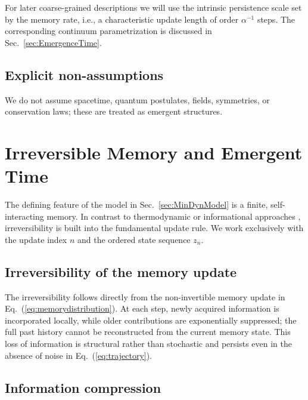 \documentclass[reprint,amsmath,amssymb,aps,prd,nofootinbib,floatfix]{revtex4-2}
\begin{document}
For later coarse-grained descriptions we will use the intrinsic persistence scale set by the memory rate, i.e., a characteristic update length of order $\alpha^{-1}$ steps.
The corresponding continuum parametrization is discussed in Sec.~\ref{sec:EmergenceTime}.

\subsection{Explicit non-assumptions}

We do not assume spacetime, quantum postulates, fields, symmetries, or conservation laws; these are treated as emergent structures.


\FloatBarrier


\section{Irreversible Memory and Emergent Time}

The defining feature of the model in Sec.~\ref{sec:MinDynModel} is a finite, self-interacting memory.
In contrast to thermodynamic or informational approaches \cite{Zeh2007,Prigogine1980,Rovelli1993}, irreversibility is built into the fundamental update rule.
We work exclusively with the update index $n$ and the ordered state sequence $z_n$.

\subsection{Irreversibility of the memory update}

The irreversibility follows directly from the non-invertible memory update in Eq.~(\ref{eq:memorydistribution}).
At each step, newly acquired information is incorporated locally, while older contributions are exponentially suppressed; the full past history cannot be reconstructed from the current memory state.
This loss of information is structural rather than stochastic and persists even in the absence of noise in Eq.~(\ref{eq:trajectory}).

\subsection{Information compression}
\end{document}
